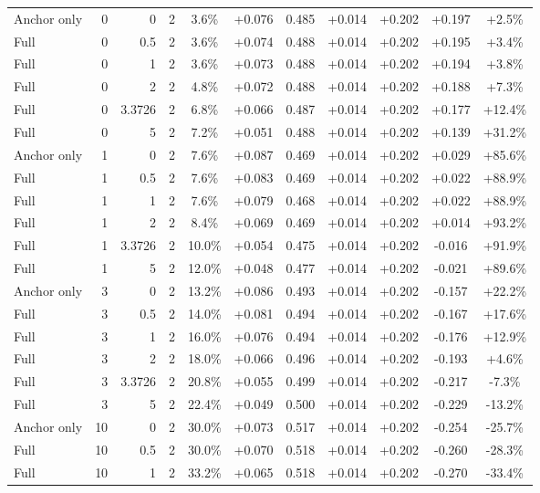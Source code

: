 \begin{table}[htbp]
\begin{tabular}{lrrrccccccc}
Anchor only & 0 & 0 & 2 & 3.6\% & +0.076 & 0.485 & +0.014 & +0.202 & +0.197 & +2.5\% \\
Full & 0 & 0.5 & 2 & 3.6\% & +0.074 & 0.488 & +0.014 & +0.202 & +0.195 & +3.4\% \\
Full & 0 & 1 & 2 & 3.6\% & +0.073 & 0.488 & +0.014 & +0.202 & +0.194 & +3.8\% \\
Full & 0 & 2 & 2 & 4.8\% & +0.072 & 0.488 & +0.014 & +0.202 & +0.188 & +7.3\% \\
Full & 0 & 3.3726 & 2 & 6.8\% & +0.066 & 0.487 & +0.014 & +0.202 & +0.177 & +12.4\% \\
Full & 0 & 5 & 2 & 7.2\% & +0.051 & 0.488 & +0.014 & +0.202 & +0.139 & +31.2\% \\
Anchor only & 1 & 0 & 2 & 7.6\% & +0.087 & 0.469 & +0.014 & +0.202 & +0.029 & +85.6\% \\
Full & 1 & 0.5 & 2 & 7.6\% & +0.083 & 0.469 & +0.014 & +0.202 & +0.022 & +88.9\% \\
Full & 1 & 1 & 2 & 7.6\% & +0.079 & 0.468 & +0.014 & +0.202 & +0.022 & +88.9\% \\
Full & 1 & 2 & 2 & 8.4\% & +0.069 & 0.469 & +0.014 & +0.202 & +0.014 & +93.2\% \\
Full & 1 & 3.3726 & 2 & 10.0\% & +0.054 & 0.475 & +0.014 & +0.202 & -0.016 & +91.9\% \\
Full & 1 & 5 & 2 & 12.0\% & +0.048 & 0.477 & +0.014 & +0.202 & -0.021 & +89.6\% \\
Anchor only & 3 & 0 & 2 & 13.2\% & +0.086 & 0.493 & +0.014 & +0.202 & -0.157 & +22.2\% \\
Full & 3 & 0.5 & 2 & 14.0\% & +0.081 & 0.494 & +0.014 & +0.202 & -0.167 & +17.6\% \\
Full & 3 & 1 & 2 & 16.0\% & +0.076 & 0.494 & +0.014 & +0.202 & -0.176 & +12.9\% \\
Full & 3 & 2 & 2 & 18.0\% & +0.066 & 0.496 & +0.014 & +0.202 & -0.193 & +4.6\% \\
Full & 3 & 3.3726 & 2 & 20.8\% & +0.055 & 0.499 & +0.014 & +0.202 & -0.217 & -7.3\% \\
Full & 3 & 5 & 2 & 22.4\% & +0.049 & 0.500 & +0.014 & +0.202 & -0.229 & -13.2\% \\
Anchor only & 10 & 0 & 2 & 30.0\% & +0.073 & 0.517 & +0.014 & +0.202 & -0.254 & -25.7\% \\
Full & 10 & 0.5 & 2 & 30.0\% & +0.070 & 0.518 & +0.014 & +0.202 & -0.260 & -28.3\% \\
Full & 10 & 1 & 2 & 33.2\% & +0.065 & 0.518 & +0.014 & +0.202 & -0.270 & -33.4\% \\

\end{tabular}
\end{table}
